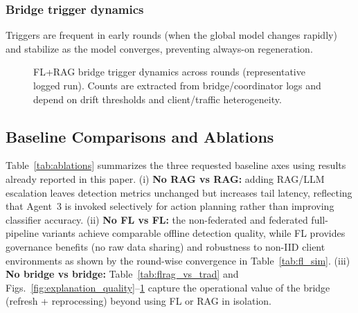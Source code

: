 \documentclass[conference]{IEEEtran}
\begin{document}
\subsubsection{Bridge trigger dynamics}
Triggers are frequent in early rounds (when the global model changes rapidly) and stabilize as the model converges, preventing always-on regeneration.

\begin{figure}[t]
\centering
{}
\caption{FL+RAG bridge trigger dynamics across rounds (representative logged run). Counts are extracted from bridge/coordinator logs and depend on drift thresholds and client/traffic heterogeneity.}
\label{fig:trigger_dynamics}
\end{figure}

\subsection{Baseline Comparisons and Ablations}
\label{sec:baselines}

Table~\ref{tab:ablations} summarizes the three requested baseline axes using results already reported in this paper. (i) \textbf{No RAG vs RAG:} adding RAG/LLM escalation leaves detection metrics unchanged but increases tail latency, reflecting that Agent~3 is invoked selectively for action planning rather than improving classifier accuracy. (ii) \textbf{No FL vs FL:} the non-federated and federated full-pipeline variants achieve comparable offline detection quality, while FL provides governance benefits (no raw data sharing) and robustness to non-IID client environments as shown by the round-wise convergence in Table~\ref{tab:fl_sim}. (iii) \textbf{No bridge vs bridge:} Table~\ref{tab:flrag_vs_trad} and Figs.~\ref{fig:explanation_quality}--\ref{fig:trigger_dynamics} capture the operational value of the bridge (refresh + reprocessing) beyond using FL or RAG in isolation.
\end{document}
